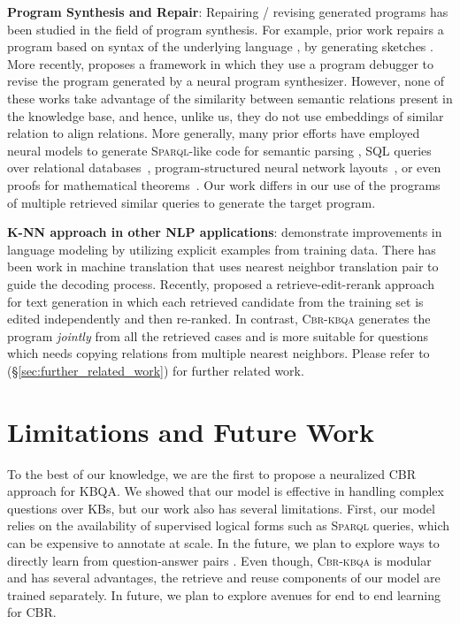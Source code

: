 \documentclass[11pt]{article}
\newcommand{\spql}{\textsc{Sparql}\xspace}
\newcommand{\alg}{\textsc{Cbr-kbqa}\xspace}
\begin{document}
\noindent\textbf{Program Synthesis and Repair}: Repairing / revising generated programs has been studied in the field of program synthesis. For example, prior work repairs a program based on syntax of the underlying language \cite{le2017s3}, by generating sketches \cite{hua2018towards}. More recently, \citet{gupta2020synthesize} proposes a framework in which they use a program debugger to revise the program generated by a neural program synthesizer. However, none of these works take advantage of the similarity between semantic relations present in the knowledge base, and hence, unlike us, they do not use embeddings of similar relation to align relations. More generally, many prior efforts have employed neural models to generate \spql -like code for semantic parsing \cite{dong2016language,balog2016deepcoder,zhong2017seq2sql}, SQL queries over relational databases~\cite{zhongSeq2SQL2017}, program-structured neural network layouts~\cite{Andreas_2016_CVPR}, or even proofs for mathematical theorems~\cite{polu2020generative}.
Our work differs in our use of the programs of multiple retrieved similar queries to generate the target program.

\noindent\textbf{K-NN approach in other NLP applications}:  \citet{khandelwal2019generalization} demonstrate improvements in language modeling by utilizing explicit examples from training data. There has been work in machine translation \cite{zhang2018guiding,gu2018search,khandelwal2020nearest} that uses nearest neighbor translation pair to guide the decoding process. Recently, \citet{hossain2020simple} proposed a retrieve-edit-rerank approach for text generation in which each retrieved candidate from the training set is edited independently and then re-ranked. In contrast, \alg generates the program \emph{jointly} from all the retrieved cases and is more suitable for questions which needs copying relations from multiple nearest neighbors. Please refer to (\S\ref{sec:further_related_work}) for further related work.
 
\section{Limitations and Future Work}
\vspace{-2mm}
\label{sec:limitations}
To the best of our knowledge, we are the first to propose a neuralized CBR approach for KBQA. We showed that our model is effective in handling complex questions over KBs, but our work also has several limitations. First, our model relies on the availability of supervised logical forms such as \spql queries, which can be expensive to annotate at scale. In the future, we plan to explore ways to directly learn from question-answer pairs \cite{berant2013semantic,liang2016neural}. Even though, \alg is modular and has several advantages, the retrieve and reuse components of our model are trained separately. In future, we plan to explore avenues for end to end learning for CBR. 
\end{document}
